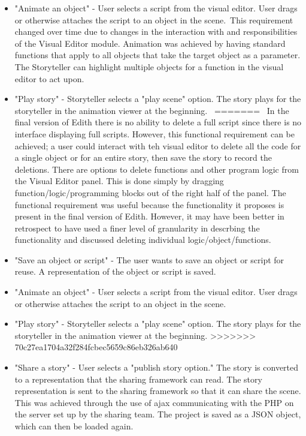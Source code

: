 \documentclass[12pt]{article}
\begin{document}
\begin{itemize}
\item "Animate an object" -  User selects a script from the visual editor. User drags or otherwise attaches the script to an object in the scene.\
This requirement changed over time due to changes in the interaction with and responsibilities of the Visual Editor module. Animation was achieved by having standard functions that apply to all objects that take the target object as a parameter. The Storyteller can highlight multiple objects for a function in the visual editor to act upon.

\item "Play story" - Storyteller selects a "play scene" option. The story plays for the storyteller in the animation viewer at the beginning.\
=======
\ In the final version of Edith there is no ability to delete a full script since there is no interface displaying full scripts. However, this functional requirement can be achieved; a user could interact with teh visual editor to delete all the code for a single object or for an entire story, then save the story to record the deletions. There are options to delete functions and other program logic from the Visual Editor panel. This is done simply by dragging function/logic/programming blocks out of the right half of the panel. The functional requirement was useful because the functionality it proposes is present in the final version of Edith. However, it may have been better in retrospect to have used a finer level of granularity in descrbing the functionality and discussed deleting individual logic/object/functions.

\item "Save an object or script" - The user wants to save an object or script for reuse. A representation of the object or script is saved.
\item "Animate an object" -  User selects a script from the visual editor. User drags or otherwise attaches the script to an object in the scene.
\item "Play story" - Storyteller selects a "play scene" option. The story plays for the storyteller in the animation viewer at the beginning.
>>>>>>> 70c27ea1704a32f284fcbec5659c86eb326ab640
\item "Share a story" - User selects a "publish story option." The story is converted to a representation that the sharing framework can read. The story representation is sent to the sharing framework so that it can share the scene.
This was achieved through the use of ajax communicating with the PHP on the server set up by the sharing team. The project is saved as a JSON object, which can then be loaded again.
\end{itemize}
\end{document}
